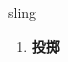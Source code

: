 
\begin{frame}
{\huge sling}
\begin{center}
\begin{enumerate}\Large
  \item \textbf{投掷}
\end{enumerate}
\end{center}
\end{frame}
